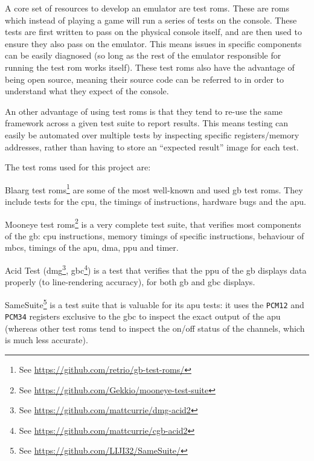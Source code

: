 \documentclass[11pt]{informatics-report}
\newcommand{\ftnt}[1]{\footnote{See \url{#1}}}
\begin{document}
A core set of resources to develop an emulator are test \glspl{rom}. These are \glspl{rom} which instead of playing a game will run a series of tests on the console. These tests are first written to pass on the physical console itself, and are then used to ensure they also pass on the emulator. This means issues in specific components can be easily diagnosed (so long as the rest of the emulator responsible for running the test \gls{rom} works itself). These test \glspl{rom} also have the advantage of being open source, meaning their source code can be referred to in order to understand what they expect of the console.

An other advantage of using test \glspl{rom} is that they tend to re-use the same framework across a given test suite to report results. This means testing can easily be automated over multiple tests by inspecting specific registers/memory addresses, rather than having to store an ``expected result'' image for each test.

The test \glspl{rom} used for this project are:

\begin{compactitem}
    \item Blaarg test \glspl{rom}\ftnt{https://github.com/retrio/gb-test-roms/} are some of the most well-known and used \gls{gb} test \glspl{rom}. They include tests for the \gls{cpu}, the timings of instructions, hardware bugs and the \gls{apu}.
    \item Mooneye test \glspl{rom}\ftnt{https://github.com/Gekkio/mooneye-test-suite} is a very complete test suite, that verifies most components of the \gls{gb}: \gls{cpu} instructions, memory timings of specific instructions, behaviour of \glspl{mbc}, timings of the \gls{apu}, \gls{dma}, \gls{ppu} and timer.
    \item Acid Test (\gls{dmg}\ftnt{https://github.com/mattcurrie/dmg-acid2}, \gls{gbc}\ftnt{https://github.com/mattcurrie/cgb-acid2}) is a test that verifies that the \gls{ppu} of the \gls{gb} displays data properly (to line-rendering accuracy), for both \glsdesc{gb} and \glsdesc{gbc} displays.
    \item SameSuite\ftnt{https://github.com/LIJI32/SameSuite/} is a test suite that is valuable for its \gls{apu} tests: it uses the \texttt{PCM12} and \texttt{PCM34} registers exclusive to the \gls{gbc} to inspect the exact output of the \gls{apu} (whereas other test \glspl{rom} tend to inspect the on/off status of the channels, which is much less accurate).
\end{compactitem}
\end{document}
